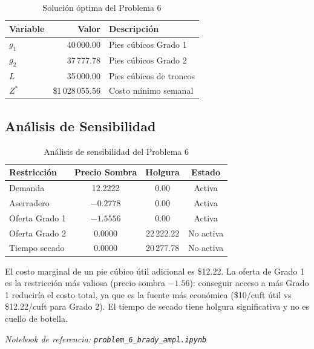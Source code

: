 \documentclass[12pt,a4paper]{article}
\begin{document}
\begin{table}[h]
\centering
\begin{tabular}{lrl}
\toprule
\textbf{Variable} & \textbf{Valor} & \textbf{Descripción} \\
\midrule
$g_1$ & 40\,000.00 & Pies cúbicos Grado 1 \\
$g_2$ & 37\,777.78 & Pies cúbicos Grado 2 \\
$L$ & 35\,000.00 & Pies cúbicos de troncos \\
$Z^*$ & \$1\,028\,055.56 & Costo mínimo semanal \\
\bottomrule
\end{tabular}
\caption{Solución óptima del Problema 6}
\end{table}

\subsection{Análisis de Sensibilidad}

\begin{table}[h]
\centering
\begin{tabular}{lccc}
\toprule
\textbf{Restricción} & \textbf{Precio Sombra} & \textbf{Holgura} & \textbf{Estado} \\
\midrule
Demanda & 12.2222 & 0.00 & Activa \\
Aserradero & $-0.2778$ & 0.00 & Activa \\
Oferta Grado 1 & $-1.5556$ & 0.00 & Activa \\
Oferta Grado 2 & 0.0000 & 22\,222.22 & No activa \\
Tiempo secado & 0.0000 & 20\,277.78 & No activa \\
\bottomrule
\end{tabular}
\caption{Análisis de sensibilidad del Problema 6}
\end{table}

El costo marginal de un pie cúbico útil adicional es \$12.22. La oferta de Grado 1 es la restricción más valiosa (precio sombra $-1.56$): conseguir acceso a más Grado 1 reduciría el costo total, ya que es la fuente más económica (\$10/cuft útil vs \$12.22/cuft para Grado 2). El tiempo de secado tiene holgura significativa y no es cuello de botella.

\textit{Notebook de referencia: \texttt{problem\_6\_brady\_ampl.ipynb}}

\newpage

\end{document}
